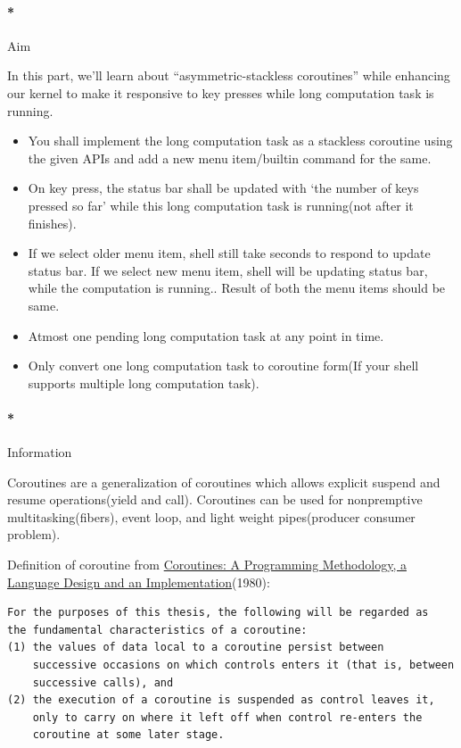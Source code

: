 \documentclass[]{article}
\providecommand{\tightlist}{%
  \setlength{\itemsep}{0pt}\setlength{\parskip}{0pt}}
\let\oldparagraph\paragraph
\renewcommand{\paragraph}[1]{\oldparagraph{#1}\mbox{}}
\begin{document}
\paragraph*{Aim}\label{aim-4}

In this part, we'll learn about ``asymmetric-stackless coroutines''
while enhancing our kernel to make it responsive to key presses while
long computation task is running.

\begin{itemize}
\tightlist
\item
  You shall implement the long computation task as a stackless coroutine
  using the given APIs and add a new menu item/builtin command for the
  same.
\item
  On key press, the status bar shall be updated with `the number of keys
  pressed so far' while this long computation task is running(not after
  it finishes).
\item
  If we select older menu item, shell still take seconds to respond to
  update status bar. If we select new menu item, shell will be updating
  status bar, while the computation is running.. Result of both the menu
  items should be same.
\item
  Atmost one pending long computation task at any point in time.
\item
  Only convert one long computation task to coroutine form(If your shell
  supports multiple long computation task).
\end{itemize}

\paragraph*{Information}\label{information-4}

Coroutines are a generalization of coroutines which allows explicit
suspend and resume operations(yield and call). Coroutines can be used
for nonpremptive multitasking(fibers), event loop, and light weight
pipes(producer consumer problem).

Definition of coroutine from
\href{http://books.google.co.in/books?id=bIAxhJor1EYC\&printsec=frontcover}{Coroutines:
A Programming Methodology, a Language Design and an
Implementation}(1980):

\begin{verbatim}
For the purposes of this thesis, the following will be regarded as
the fundamental characteristics of a coroutine:
(1) the values of data local to a coroutine persist between
    successive occasions on which controls enters it (that is, between
    successive calls), and
(2) the execution of a coroutine is suspended as control leaves it,
    only to carry on where it left off when control re-enters the
    coroutine at some later stage.
\end{verbatim}
\end{document}
